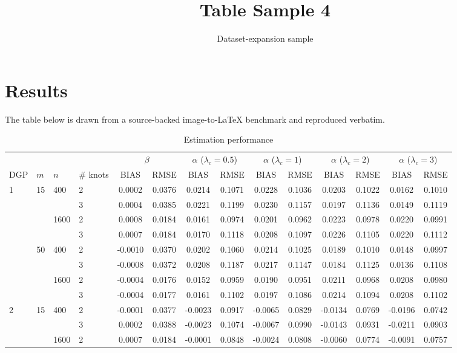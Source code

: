 \documentclass[11pt]{article}
\title{Table Sample 4}
\author{Dataset-expansion sample}
\date{}
\begin{document}
\maketitle
\section{Results}
The table below is drawn from a source-backed image-to-LaTeX benchmark and reproduced verbatim.

\begin{table}
[ht]
\caption{Estimation performance}
\centering\footnotesize
\begin{tabular}
{llll|cccccccccc}
\hline \hline
& & & & \multicolumn{2}{c}{$\beta$} & \multicolumn{2}{c}{$\alpha$ ($\lambda_c = 0.5$)} & \multicolumn{2}{c}{$\alpha$ ($\lambda_c = 1$)} & \multicolumn{2}{c}{$\alpha$ ($\lambda_c = 2$)} & \multicolumn{2}{c}{$\alpha$ ($\lambda_c = 3$)} \\
DGP & $m$ & $n$ & \# knots & BIAS & RMSE & BIAS & RMSE & BIAS & RMSE & BIAS & RMSE & BIAS & RMSE \\
\hline
1 & 15 & 400 & 2 & 0.0002 & 0.0376 & 0.0214 & 0.1071 & 0.0228 & 0.1036 & 0.0203 & 0.1022 & 0.0162 & 0.1010 \\
& & & 3 & 0.0004 & 0.0385 & 0.0221 & 0.1199 & 0.0230 & 0.1157 & 0.0197 & 0.1136 & 0.0149 & 0.1119 \\
& & 1600 & 2 & 0.0008 & 0.0184 & 0.0161 & 0.0974 & 0.0201 & 0.0962 & 0.0223 & 0.0978 & 0.0220 & 0.0991 \\
& & & 3 & 0.0007 & 0.0184 & 0.0170 & 0.1118 & 0.0208 & 0.1097 & 0.0226 & 0.1105 & 0.0220 & 0.1112 \\
& 50 & 400 & 2 & -0.0010 & 0.0370 & 0.0202 & 0.1060 & 0.0214 & 0.1025 & 0.0189 & 0.1010 & 0.0148 & 0.0997 \\
& & & 3 & -0.0008 & 0.0372 & 0.0208 & 0.1187 & 0.0217 & 0.1147 & 0.0184 & 0.1125 & 0.0136 & 0.1108 \\
& & 1600 & 2 & -0.0004 & 0.0176 & 0.0152 & 0.0959 & 0.0190 & 0.0951 & 0.0211 & 0.0968 & 0.0208 & 0.0980 \\
& & & 3 & -0.0004 & 0.0177 & 0.0161 & 0.1102 & 0.0197 & 0.1086 & 0.0214 & 0.1094 & 0.0208 & 0.1102 \\
2 & 15 & 400 & 2 & -0.0001 & 0.0377 & -0.0023 & 0.0917 & -0.0065 & 0.0829 & -0.0134 & 0.0769 & -0.0196 & 0.0742 \\
& & & 3 & 0.0002 & 0.0388 & -0.0023 & 0.1074 & -0.0067 & 0.0990 & -0.0143 & 0.0931 & -0.0211 & 0.0903 \\
& & 1600 & 2 & 0.0007 & 0.0184 & -0.0001 & 0.0848 & -0.0024 & 0.0808 & -0.0060 & 0.0774 & -0.0091 & 0.0757 \\

\end{tabular}
\end{table}
\end{document}
